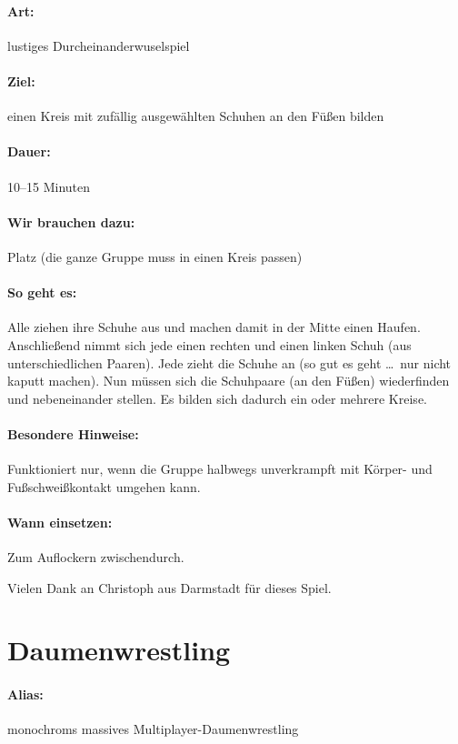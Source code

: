 \paragraph{Art:} lustiges Durcheinanderwuselspiel
\paragraph{Ziel:} einen Kreis mit zufällig ausgewählten Schuhen an den Füßen bilden
\paragraph{Dauer:} 10--15 Minuten
\paragraph{Wir brauchen dazu:} Platz (die ganze Gruppe muss in einen Kreis passen)
\paragraph{So geht es:} Alle ziehen ihre Schuhe aus und machen damit in der Mitte einen Haufen. Anschließend nimmt sich jede einen rechten und einen linken Schuh (aus unterschiedlichen Paaren). Jede zieht die Schuhe an (so gut es geht \ldots\ nur nicht kaputt machen). Nun müssen sich die Schuhpaare (an den Füßen) wiederfinden und nebeneinander stellen. Es bilden sich dadurch ein oder mehrere Kreise.
\paragraph{Besondere Hinweise:} Funktioniert nur, wenn die Gruppe halbwegs unverkrampft mit Körper- und Fußschweißkontakt umgehen kann.
\paragraph{Wann einsetzen:} Zum Auflockern zwischendurch.

Vielen Dank an Christoph aus Darmstadt für dieses Spiel.


\section{Daumenwrestling}
\paragraph{Alias:} monochroms massives Multiplayer-Daumenwrestling
